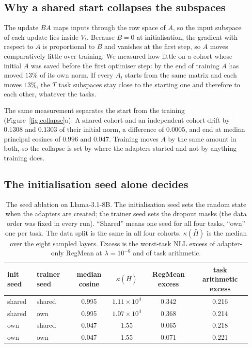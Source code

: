 \subsection{Why a shared start collapses the subspaces}\label{subsec:why}

The update $BA$ maps inputs through the row space of $A$, so the input
subspace of each update lies inside $V_t$. Because $B = 0$ at
initialisation, the gradient with respect to $A$ is proportional to $B$ and
vanishes at the first step, so $A$ moves comparatively little over training.
We measured how little on a cohort whose initial $A$ was saved before the first
optimiser step: by the end of training $A$ has moved $13\%$ of its own norm.
If every $A_t$ starts from the same matrix and each moves $13\%$, the $T$ task
subspaces stay close to the starting one and therefore to each other, whatever
the tasks.

The same measurement separates the start from the training
(Figure~\ref{fig:collapse}a). A shared cohort and an independent cohort drift
by $0.1308$ and $0.1303$ of their initial norm, a difference of $0.0005$, and
end at median principal cosines of $0.996$ and $0.047$. Training moves $A$ by the same amount in both, so the collapse is set
by where the adapters started and not by anything training does.

\subsection{The initialisation seed alone decides}\label{subsec:seeds}

\begin{table}[pos=tbp]
\centering
\small
\caption{The seed ablation on Llama-3.1-8B. The initialisation seed sets the
random state when the adapters are created; the trainer seed sets the dropout
masks (the data order was fixed in every run). ``Shared'' means one seed for
all four tasks, ``own'' one per task. The data split is the same in all four
cohorts. $\kappa(\bar H)$ is the median over the eight sampled layers. Excess is the
worst-task NLL excess of adapter-only RegMean at $\lambda = 10^{-6}$ and of
task arithmetic.}
\label{tab:seeds}
\begin{tabular}{llcccc}
\toprule
init seed & trainer seed & median cosine & $\kappa(\bar H)$
 & RegMean excess & task arithmetic excess \\
\midrule
shared & shared & 0.995 & $1.11\times10^{4}$ & 0.342 & 0.216 \\
shared & own    & 0.995 & $1.07\times10^{4}$ & 0.368 & 0.214 \\
own    & shared & 0.047 & 1.55 & 0.065 & 0.218 \\
own    & own    & 0.047 & 1.55 & 0.071 & 0.221 \\
\bottomrule
\end{tabular}
\end{table}

